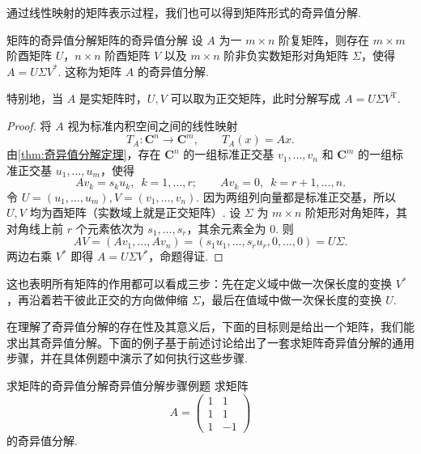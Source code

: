 通过线性映射的矩阵表示过程，我们也可以得到矩阵形式的奇异值分解.

\begin{theorem}{矩阵的奇异值分解}{矩阵的奇异值分解}
    设 $A$ 为一 $m \times n$ 阶复矩阵，则存在 $m \times m$ 阶酉矩阵 $U$，$n \times n$ 阶酉矩阵 $V$ 以及 $m \times n$ 阶非负实数矩形对角矩阵 $\Sigma$，使得 $A = U \Sigma V^*$. 这称为矩阵 $A$ 的奇异值分解.

    特别地，当 $A$ 是实矩阵时，$U, V$ 可以取为正交矩阵，此时分解写成 $A = U \Sigma V^{\mathrm{T}}$.
\end{theorem}

\begin{proof}
    将 $A$ 视为标准内积空间之间的线性映射
    \[
        T_A : \mathbf{C}^n \to \mathbf{C}^m,\qquad T_A(x) = Ax.
    \]
    由\autoref{thm:奇异值分解定理}，存在 $\mathbf{C}^n$ 的一组标准正交基 $v_1, \ldots, v_n$ 和 $\mathbf{C}^m$ 的一组标准正交基 $u_1, \ldots, u_m$，使得
    \[
        Av_k = s_k u_k,\enspace k = 1, \ldots, r;\qquad Av_k = 0,\enspace k = r+1, \ldots, n.
    \]
    令 $U = (u_1, \ldots, u_m), V = (v_1, \ldots, v_n)$. 因为两组列向量都是标准正交基，所以 $U, V$ 均为酉矩阵（实数域上就是正交矩阵）. 设 $\Sigma$ 为 $m \times n$ 阶矩形对角矩阵，其对角线上前 $r$ 个元素依次为 $s_1, \ldots, s_r$，其余元素全为 $0$. 则
    \[
        AV = (Av_1, \ldots, Av_n) = (s_1u_1, \ldots, s_ru_r, 0, \ldots, 0) = U\Sigma.
    \]
    两边右乘 $V^*$ 即得 $A = U\Sigma V^*$，命题得证.
\end{proof}

这也表明所有矩阵的作用都可以看成三步：先在定义域中做一次保长度的变换 $V^*$，再沿着若干彼此正交的方向做伸缩 $\Sigma$，最后在值域中做一次保长度的变换 $U$.

在理解了奇异值分解的存在性及其意义后，下面的目标则是给出一个矩阵，我们能求出其奇异值分解。下面的例子基于前述讨论给出了一套求矩阵奇异值分解的通用步骤，并在具体例题中演示了如何执行这些步骤.

\begin{example}{求矩阵的奇异值分解}{奇异值分解步骤例题}
    求矩阵
    \[
        A = \begin{pmatrix}
            1 & 1  \\
            1 & 1  \\
            1 & -1
        \end{pmatrix}
    \]
    的奇异值分解.
\end{example}

